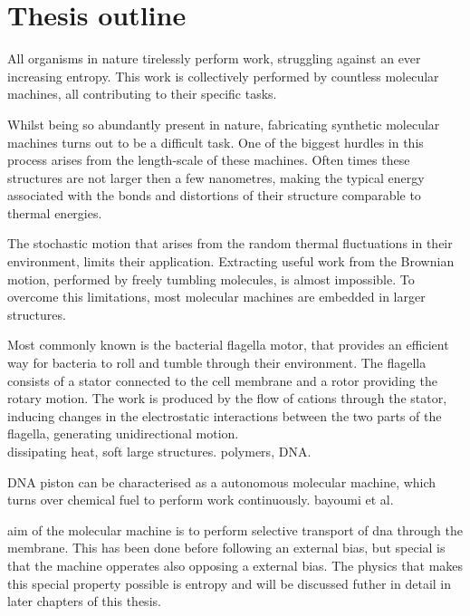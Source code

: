 \section{Thesis outline}

All organisms in nature tirelessly perform work, struggling against an ever increasing
entropy. This work is collectively performed by countless molecular machines, all
contributing to their specific tasks.


Whilst being so abundantly present in nature, fabricating synthetic molecular machines
turns out to be a difficult task. One of the biggest hurdles in this process arises from
the length-scale of these machines. Often times these structures are not larger then
a few nanometres, making the typical energy associated with the bonds and
distortions of their structure comparable to thermal energies.


The stochastic motion that arises from the random thermal fluctuations in their
environment, limits their application. Extracting useful work from the Brownian motion,
performed by freely tumbling molecules, is almost impossible. To overcome this
limitations, most molecular machines are embedded in larger structures.


Most commonly known is the bacterial flagella motor, that provides an efficient way for
bacteria to roll and tumble through their environment. The flagella consists of a
stator connected to the cell membrane and a rotor providing the rotary motion. The
work is produced by the flow of cations through the stator, inducing changes in the
electrostatic interactions between the two parts of the flagella, generating
unidirectional motion.\\


dissipating heat, soft large structures.  polymers, DNA.

DNA piston can be characterised as a autonomous molecular machine, which turns
over chemical fuel to perform work continuously. bayoumi et al.

aim of the molecular machine is to perform selective transport of dna through the
membrane. This has been done before following an external bias, but special is that the
machine opperates also opposing a external bias. The physics that makes this special
property possible is entropy and will be discussed futher in detail in later chapters of
this thesis.

